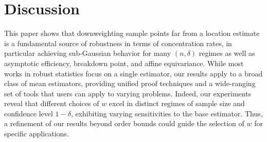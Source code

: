 \documentclass{article}
\theoremstyle{plain}
\theoremstyle{definition}
\begin{document}
\section{Discussion}
This paper shows that downweighting sample points far from a location estimate is a fundamental source of robustness in terms of concentration rates, in particular achieving sub-Gaussian behavior for many $(n,\delta)$ regimes as well as asymptotic efficiency, breakdown point, and affine equivariance. While most works in robust statistics focus on a single estimator, our results apply to a broad class of mean estimators, providing unified proof techniques and a wide-ranging set of tools that users can apply to varying problems. Indeed, our experiments reveal that different choices of $w$ excel in distinct regimes of sample size and confidence level $1-\delta$, exhibiting varying sensitivities to the base estimator. Thus, a refinement of our results beyond order bounds could guide the selection of $w$ for specific applications.
\end{document}
